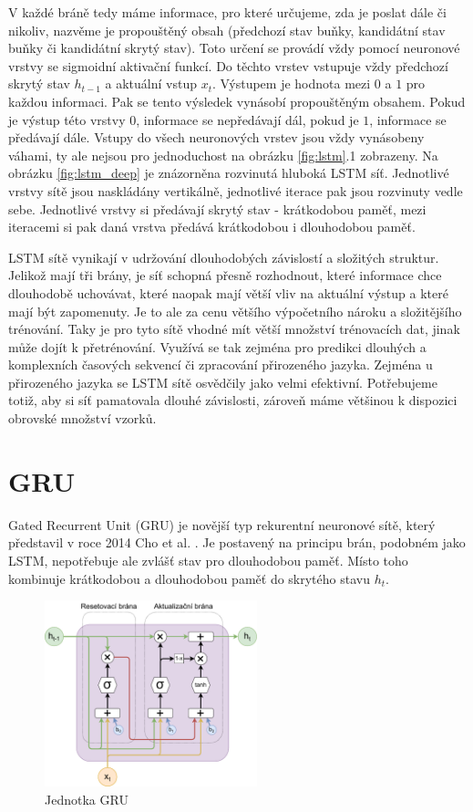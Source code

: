 V každé bráně tedy máme informace, pro které určujeme, zda je poslat dále či
nikoliv, nazvěme je propouštěný obsah (předchozí stav buňky, kandidátní stav
buňky či kandidátní skrytý stav). Toto určení se provádí vždy pomocí neuronové
vrstvy se sigmoidní aktivační funkcí. Do těchto vrstev vstupuje vždy předchozí
skrytý stav $h_{t-1}$ a aktuální vstup $x_t$. Výstupem je hodnota mezi $0$ a
$1$ pro každou informaci. Pak se tento výsledek vynásobí propouštěným obsahem.
Pokud je výstup této vrstvy $0$, informace se nepředávají dál, pokud je $1$,
informace se předávají dále. Vstupy do všech neuronových vrstev jsou vždy
vynásobeny váhami, ty ale nejsou pro jednoduchost na obrázku \ref{fig:lstm}.1
zobrazeny. Na obrázku \ref{fig:lstm_deep} je znázorněna rozvinutá hluboká LSTM
síť. Jednotlivé vrstvy sítě jsou naskládány vertikálně, jednotlivé iterace pak
jsou rozvinuty vedle sebe. Jednotlivé vrstvy si předávají skrytý stav -
krátkodobou paměť, mezi iteracemi si pak daná vrstva předává krátkodobou i
dlouhodobou paměť.

LSTM sítě vynikají v udržování dlouhodobých závislostí a složitých struktur.
Jelikož mají tři brány, je síť schopná přesně rozhodnout, které informace chce
dlouhodobě uchovávat, které naopak mají větší vliv na aktuální výstup a které
mají být zapomenuty. Je to ale za cenu většího výpočetního nároku a
složitějšího trénování. Taky je pro tyto sítě vhodné mít větší množství
trénovacích dat, jinak může dojít k přetrénování. Využívá se tak zejména pro
predikci dlouhých a komplexních časových sekvencí či zpracování přirozeného
jazyka. Zejména u přirozeného jazyka se LSTM sítě osvědčily jako velmi
efektivní. Potřebujeme totiž, aby si síť pamatovala dlouhé závislosti, zároveň
máme většinou k dispozici obrovské množství vzorků.

\section{GRU}

Gated Recurrent Unit (GRU) je novější typ rekurentní neuronové sítě, který
představil v roce 2014 Cho et al. \cite{gru}. Je postavený na principu brán,
podobném jako LSTM, nepotřebuje ale zvlášť stav pro dlouhodobou paměť. Místo
toho kombinuje krátkodobou a dlouhodobou paměť do skrytého stavu $h_t$.

\begin{figure}
    \centering
    \includegraphics[width=0.55\textwidth]{Figures/GRU_unit.pdf}
    \caption{Jednotka GRU}
    \label{fig:gru_unit}
\end{figure}

